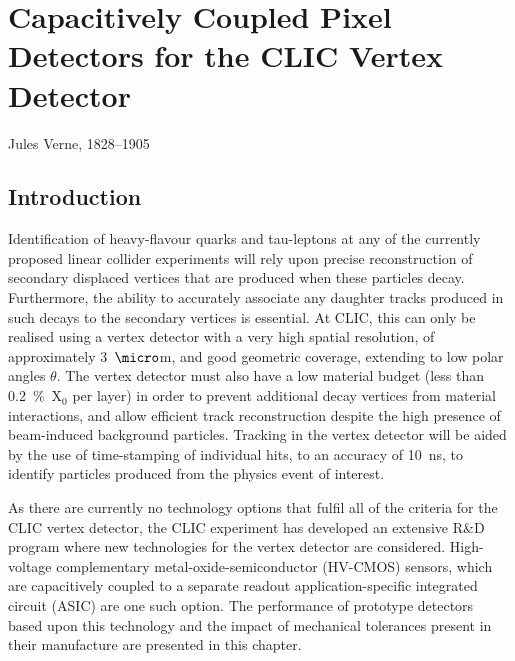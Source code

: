 \chapter{Capacitively Coupled Pixel Detectors for the CLIC Vertex Detector}
\label{chap:clicvertex}

{Jules Verne, 1828--1905}


\section{Introduction}

Identification of heavy-flavour quarks and tau-leptons at any of the currently proposed linear collider experiments will rely upon precise reconstruction of secondary displaced vertices that are produced when these particles decay.  Furthermore, the ability to accurately associate any daughter tracks produced in such decays to the secondary vertices is essential.  At CLIC, this can only be realised using a vertex detector with a very high spatial resolution, of approximately 3~${\micro}$m, and good geometric coverage, extending to low polar angles $\theta$.  The vertex detector must also have a low material budget (less than 0.2~\%~$\text{X}_{0}$ per layer) in order to prevent additional decay vertices from material interactions, and allow efficient track reconstruction despite the high presence of beam-induced background particles.  Tracking in the vertex detector will be aided by the use of time-stamping of individual hits, to an accuracy of 10~ns, to identify particles produced from the physics event of interest.  

As there are currently no technology options that fulfil all of the criteria for the CLIC vertex detector, the CLIC experiment has developed an extensive R\&D program where new technologies for the vertex detector are considered.  High-voltage complementary metal-oxide-semiconductor (HV-CMOS) sensors, which are capacitively coupled to a separate readout application-specific integrated circuit (ASIC) are one such option. The performance of prototype detectors based upon this technology and the impact of mechanical tolerances present in their manufacture are presented in this chapter.  


